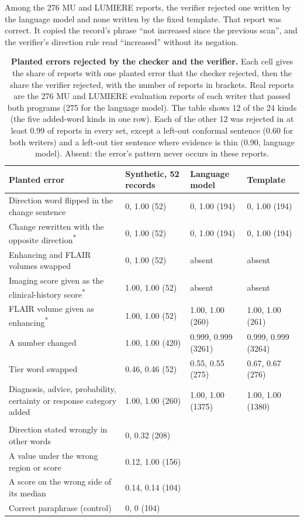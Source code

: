\documentclass[largeformat]{interact} %
\begin{document}
Among the 276 MU and LUMIERE reports, the verifier rejected one written by the language
model and none written by the fixed template. That report was correct. It copied the record's phrase ``not increased
since the previous scan'', and the verifier's direction rule read ``increased'' without its negation.

\begin{table}[!htbp]
\centering
\caption[Planted errors]{\textbf{Planted errors rejected by the checker and the verifier.} Each cell gives the share
of reports with one planted error that the checker rejected, then the share the verifier rejected, with the number of
reports in brackets. Real reports are the 276 MU and LUMIERE evaluation reports of each writer that passed both programs (275 for the
language model). The table shows 12 of the 24 kinds (the five added-word kinds in one row). Each of the other 12 was rejected in
at least 0.99 of reports in every set, except a left-out conformal sentence (0.60 for both writers) and a left-out tier
sentence where evidence is thin (0.90, language model).
Absent: the error's pattern never occurs in these reports.}
\label{tab:verifier}
\footnotesize
\begin{tabularx}{\linewidth}{@{}LR{2.4cm}R{2.4cm}R{2.4cm}@{}}
\toprule
Planted error & Synthetic, 52 records & Language model & Template \\
\midrule
Direction word flipped in the change sentence & 0, 1.00 (52) & 0, 1.00 (194) & 0, 1.00 (194) \\
Change rewritten with the opposite direction\textsuperscript{*} & 0, 1.00 (52) & 0, 1.00 (194) & 0, 1.00 (194) \\
Enhancing and FLAIR volumes swapped & 0, 1.00 (52) & absent & absent \\
Imaging score given as the clinical-history score\textsuperscript{*} & 1.00, 1.00 (52) & absent & absent \\
FLAIR volume given as enhancing\textsuperscript{*} & 1.00, 1.00 (52) & 1.00, 1.00 (260) & 1.00, 1.00 (261) \\
A number changed & 1.00, 1.00 (420) & 0.999, 0.999 (3261) & 0.999, 0.999 (3264) \\
Tier word swapped & 0.46, 0.46 (52) & 0.55, 0.55 (275) & 0.67, 0.67 (276) \\
Diagnosis, advice, probability, certainty or response category added & 1.00, 1.00 (260) & 1.00, 1.00 (1375) & 1.00, 1.00 (1380) \\
\addlinespace
{} \\
Direction stated wrongly in other words & 0, 0.32 (208) & & \\
A value under the wrong region or score & 0.12, 1.00 (156) & & \\
A score on the wrong side of its median & 0.14, 0.14 (104) & & \\
Correct paraphrase (control) & 0, 0 (104) & & \\
\bottomrule
\end{tabularx}


\end{table}
\end{document}
